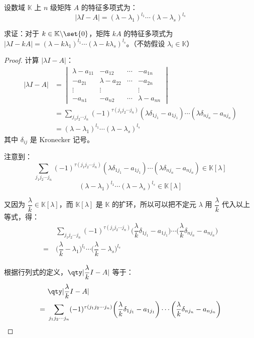\begin{exercise}
	设数域 $\mathbb K$ 上 $n$ 级矩阵 $A$ 的特征多项式为：
	$$
	|\lambda I - A| = (\lambda - \lambda_1)^{l_1} \cdots (\lambda - \lambda_s)^{l_s}
	$$

	求证：对于 $k \in \mathbb K \backslash \set{0}$，矩阵 $kA$ 的特征多项式为 $|\lambda I - kA| = (\lambda - k \lambda_1)^{l_1} \cdots (\lambda - k \lambda_s)^{l_s}$。（不妨假设 $\lambda_i \in \mathbb K$）
\end{exercise}

\begin{proof}
	计算 $|\lambda I - A|$：
	$$
	\begin{aligned}
		|\lambda I - A| &=
		\begin{vmatrix}
			\lambda - a_{11} & -a_{12} & \cdots & -a_{1n}
			\\
			-a_{21} & \lambda - a_{22} & \cdots & -a_{2n}
			\\
			\vdots & \vdots && \vdots
			\\
			-a_{n1} & -a_{n2} & \cdots & \lambda - a_{nn}
		\end{vmatrix}
		\\&=
		\sum\limits_{j_1 j_2 \cdots j_n} (-1)^{\tau(j_1 j_2 \cdots j_n)} (\lambda \delta_{1 j_1} - a_{1 j_1}) \cdots (\lambda \delta_{n j_n} - a_{n j_n})
		\\&=
		(\lambda - \lambda_1)^{l_1} \cdots (\lambda - \lambda_s)^{l_s}
	\end{aligned}
	$$
	其中 $\delta_{ij}$ 是 Kronecker 记号。

	注意到：
	$$
	\sum\limits_{j_1 j_2 \cdots j_n} (-1)^{\tau(j_1 j_2 \cdots j_n)} (\lambda \delta_{1 j_1} - a_{1 j_1}) \cdots (\lambda \delta_{n j_n} - a_{n j_n}) \in \mathbb K[\lambda]
	$$$$
	(\lambda - \lambda_1)^{l_1} \cdots (\lambda - \lambda_s)^{l_s} \in \mathbb K[\lambda]
	$$

	又因为 $\dfrac{\lambda}{k} \in \mathbb K[\lambda]$，而 $\mathbb K[\lambda]$ 是 $\mathbb K$ 的扩环，所以可以把不定元 $\lambda$ 用 $\dfrac{\lambda}{k}$ 代入以上等式，得：
	$$
	\begin{aligned}&
		\sum\limits_{j_1 j_2 \cdots j_n} (-1)^{\tau(j_1 j_2 \cdots j_n)} \biggl( \dfrac{\lambda}{k} \delta_{1 j_1} - a_{1 j_1} \biggr) \cdots \biggl( \dfrac{\lambda}{k} \delta_{n j_n} - a_{n j_n} \biggr)
		\\=~&
		\biggl( \dfrac{\lambda}{k} - \lambda_1 \biggr)^{l_1} \cdots \biggl( \dfrac{\lambda}{k} - \lambda_s \biggr)^{l_s}
	\end{aligned}
	$$

	根据行列式的定义，$\qty|\dfrac{\lambda}{k} I - A|$ 等于：
	$$
	\begin{aligned}&
		\qty|\dfrac{\lambda}{k} I - A|
		\\=~&
		\sum\limits_{j_1 j_2 \cdots j_n} (-1)^{\tau(j_1 j_2 \cdots j_n)} \biggl( \dfrac{\lambda}{k} \delta_{1 j_1} - a_{1 j_1} \biggr) \cdots \biggl( \dfrac{\lambda}{k} \delta_{n j_n} - a_{n j_n} \biggr)
	\end{aligned}
	$$


\end{proof}
